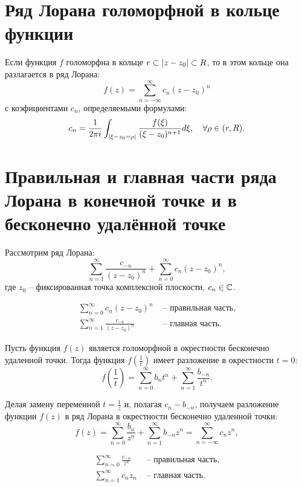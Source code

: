 \section{Ряд Лорана голоморфной в кольце функции}

\begin{theorem}
	Если функция $f$ голоморфна в кольце $r \subset \left\lvert z-z_0\right\rvert\subset R$, то в этом кольце она разлагается в ряд Лорана:
	\[
		f(z) = \sum_{n=-\infty}^{\infty}c_n(z-z_0)^n
	\]
	с коэфициентами $c_n$, определяемыми формулами:
	\[
		c_n = \frac{1}{2\pi i}\int_{\left\lvert \xi - z_0 = \rho\right\rvert}\frac{f(\xi)}{(\xi-z_0)^{n+1}}d \xi, \quad \forall \rho \in (r,R).
	\]
\end{theorem}

\section{Правильная и главная части ряда Лорана в конечной точке и в бесконечно удалённой точке}

\begin{note}
	Рассмотрим ряд Лорана:
	\[
		\sum_{n=1}^{\infty}\frac{c_{-n}}{(z-z_0)^n} + \sum_{n=0}^{\infty}c_n(z-z_0)^n,
	\]
	где $z_0$ -- фиксированная точка комплексной плоскости, $c_n \in \mathbb{C}$.

	\[
		\begin{array}{ll}
			\sum_{n=0}^{\infty}c_n(z - z_0)^n           & \text{ -- правильная часть}, \\
			\sum_{n=1}^{\infty}\frac{c_{-n}}{(z-z_0)^n} & \text{ -- главная часть}.
		\end{array}
	\]
\end{note}

\begin{note}
	Пусть функция $f(z)$ является голоморфной в окрестности бесконечно удаленной точки. Тогда функция $f\left(\frac{1}{t}\right)$ имеет разложение в окрестности $t = 0$:
	\[
		f \left(\frac{1}{t}\right) = \sum_{n=0}^{\infty}b_nt^n + \sum_{n=1}^{\infty}\frac{b_{-n}}{t^n}.
	\]

	Делая замену переменной $t = \frac{1}{z}$ и, полагая $c_n - b_{-n}$, получаем разложение функции $f(z)$ в ряд Лорана в окрестности бесконечно удаленной точки:
	\[
		f(z) = \sum_{n=0}^{\infty}\frac{b_n}{z^n} + \sum_{n=1}^{\infty}b_{-n}z^n = \sum_{n=-\infty}^{\infty} c_nz^n,
	\]

	\[
		\begin{array}{ll}
			\sum_{n=0}^{\infty}\frac{c_{-n}}{z^n} & \text{ -- правильная часть}, \\
			\sum_{n=1}^{\infty}c_nz_n             & \text{ -- главная часть}.
		\end{array}
	\]
\end{note}

